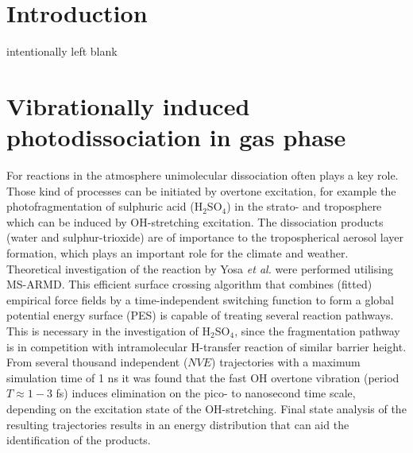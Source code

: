 \documentclass[journal=jacsat,manuscript=article]{achemso}
\author{Markus Meuwly}
\affiliation{Department of Chemistry, University of Basel, Klingelbergstrasse 80, CH-4056 Basel, Switzerland.}
\date{\today}
\title{}
\begin{document}
\begin{abstract}

\end{abstract}

\clearpage

\section{Introduction}
\label{sec:introduction} 
intentionally left blank

    
\section{Vibrationally induced photodissociation in gas phase} 
\label{sec:vibphotodis} 
For reactions in the atmosphere unimolecular dissociation often plays a key role. Those kind of processes can be initiated by overtone excitation, for example the photofragmentation of sulphuric acid (H$_2$SO$_4$) in the strato- and troposphere which can be induced by OH-stretching excitation. The dissociation products (water and sulphur-trioxide) are of importance to the tropospherical aerosol layer formation, which plays an important role for the climate and weather\cite{vaida.sci.2003.vibphotodis}.\\

\noindent 
Theoretical investigation of the reaction by Yosa \textit{et al.}\cite{reyes.pccp.2014.msarmd} were performed utilising MS-ARMD\cite{nagy.jctc.2014.msarmd}. This efficient surface crossing algorithm that combines (fitted) empirical force fields by a time-independent switching function to form a global potential energy surface (PES) is capable of treating several reaction pathways. This is necessary in the investigation of H$_2$SO$_4$, since the fragmentation pathway is in competition with intramolecular H-transfer reaction of similar barrier height. From several thousand independent ($NVE$) trajectories with a maximum simulation time of 1 ns it was found that the fast OH overtone vibration (period $T \approx 1-3$ fs) induces elimination on the pico- to nanosecond time scale, depending on the excitation state of the OH-stretching. Final state analysis of the resulting trajectories results in an energy distribution that can aid the identification of the products.\\
\end{document}
